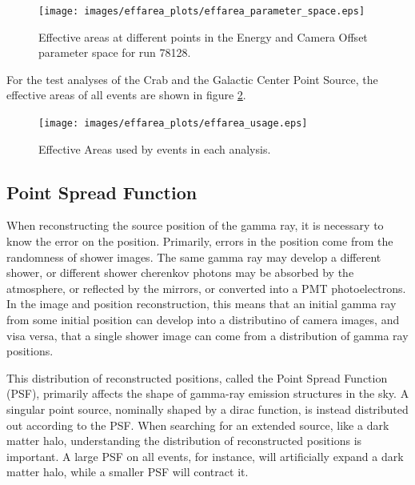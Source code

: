 \begin{figure}[ht]
  \begin{center}
    \texttt{[image: images/effarea\_plots/effarea\_parameter\_space.eps]}
    \caption[Effective Area Parameter Space]{Effective areas at different points in the Energy and Camera Offset parameter space for run 78128.}\label{fig:effarea_paramspace}
  \end{center}
\end{figure}

For the test analyses of the Crab and the Galactic Center Point Source, the effective areas of all events are shown in figure \ref{fig:effarea_usage}.

\begin{figure}[ht]
  \begin{center}
    \texttt{[image: images/effarea\_plots/effarea\_usage.eps]}
    \caption[Effective Area Parameter Space]{Effective Areas used by events in each analysis.}\label{fig:effarea_usage}
  \end{center}
\end{figure}

\subsection{Point Spread Function}\label{subsec:psf}

When reconstructing the source position of the gamma ray, it is necessary to know the error on the position.
Primarily, errors in the position come from the randomness of shower images.
The same gamma ray may develop a different shower, or different shower cherenkov photons may be absorbed by the atmosphere, or reflected by the mirrors, or converted into a PMT photoelectrons.
In the image and position reconstruction, this means that an initial gamma ray from some initial position can develop into a distributino of camera images, and visa versa, that a single shower image can come from a distribution of gamma ray positions.

This distribution of reconstructed positions, called the Point Spread Function (PSF), primarily affects the shape of gamma-ray emission structures in the sky.
A singular point source, nominally shaped by a dirac function, is instead distributed out according to the PSF.
When searching for an extended source, like a dark matter halo, understanding the distribution of reconstructed positions is important.
A large PSF on all events, for instance, will artificially expand a dark matter halo, while a smaller PSF will contract it.

